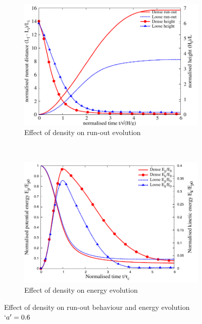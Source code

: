 \begin{figure}[tbhp]
\centering
\begin{subfigure}[b]{0.95\textwidth}
\includegraphics[width=\textwidth]{runout_height_dense_a6}
\caption{Effect of density on run-out evolution}
\label{fig:runout_height_dense_a6}
\end{subfigure}
\\
\begin{subfigure}[b]{0.95\textwidth}
\centering
\includegraphics[width=\textwidth]{Energy_dense_a6}
\caption{Effect of density on energy evolution}
\label{fig:Energy_dense_a6}
\end{subfigure}
\caption{Effect of density on run-out behaviour and energy evolution $`a' = 
0.6$}
\label{fig:Density_a6}
\end{figure}

